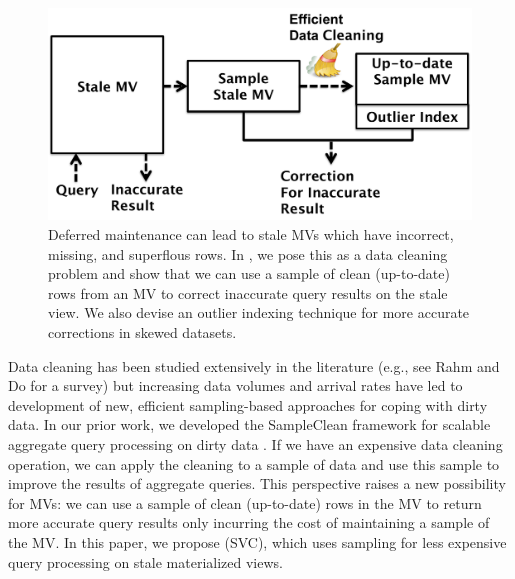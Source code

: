 \begin{figure}[t] \vspace{-2em}
\centering
 \includegraphics[scale=0.25]{figs/sys-arch.pdf} \vspace{-.25em}
 \caption{Deferred maintenance can lead to stale MVs which have incorrect, missing, and superflous rows. In \svc, we pose this as a data cleaning problem and show that we can use a sample of clean (up-to-date) rows from an MV to correct inaccurate query results on the stale view. We also devise an outlier indexing technique for more accurate corrections in skewed datasets. \label{sys-arch}}\vspace{-1.75em}
\end{figure}

Data cleaning has been studied extensively in the literature (e.g., see Rahm and Do for a survey\cite{rahm2000data}) but increasing data volumes and arrival rates have led to development of new, efficient sampling-based approaches for coping with dirty data.   
In our prior work, we developed the SampleClean framework for scalable aggregate query processing on dirty data \cite{wang1999sample}.
If we have an expensive data cleaning operation, we can apply the cleaning to a sample of data and use this sample to improve the results of aggregate queries.
This perspective raises a new possibility for MVs: we can use a sample of clean (up-to-date) rows in the MV to return more accurate query results only incurring the cost of maintaining a sample of the MV.
In this paper, we propose \svcfull (SVC), which uses sampling for less expensive query processing on stale materialized views.


